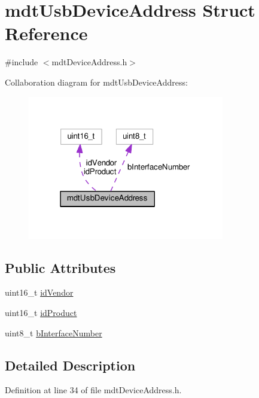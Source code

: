\hypertarget{structmdt_usb_device_address}{\section{mdt\-Usb\-Device\-Address Struct Reference}
\label{structmdt_usb_device_address}
}


{\ttfamily \#include $<$mdt\-Device\-Address.\-h$>$}



Collaboration diagram for mdt\-Usb\-Device\-Address\-:\nopagebreak
\begin{figure}[H]
\begin{center}
\leavevmode
\includegraphics[width=243pt]{structmdt_usb_device_address__coll__graph}
\end{center}
\end{figure}
\subsection*{Public Attributes}
\begin{DoxyCompactItemize}
\item 
uint16\-\_\-t \hyperlink{structmdt_usb_device_address_a7995bcabee1715f7e209edfc623f7a55}{id\-Vendor}
\item 
uint16\-\_\-t \hyperlink{structmdt_usb_device_address_aade64f7cb76af63da7cb493cebd614f2}{id\-Product}
\item 
uint8\-\_\-t \hyperlink{structmdt_usb_device_address_ac599e57df4f2a44e8c62791d1e5e5600}{b\-Interface\-Number}
\end{DoxyCompactItemize}


\subsection{Detailed Description}


Definition at line 34 of file mdt\-Device\-Address.\-h.



